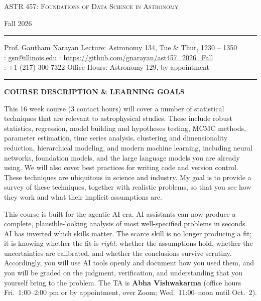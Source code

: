 

\vspace{-20em}
\centerline{\fontsize{22}{22}\selectfont\scshape  ASTR 457: Foundations of Data Science in Astronomy}
\vskip -2pt
\centerline{\headerfont Fall 2026}
\vskip -12pt
{\rule{\textwidth}{1pt}}

\vskip -10pt
Prof. Gautham Narayan                      \hfill Lecture: Astronomy 134, Tue \& Thur, 1230 -- 1350\\
\Letter: \href{mailto:gsn@illinois.edu}{gsn@illinois.edu} \hfill \Mundus: \url{https://github.com/gnarayan/ast457_2026_Fall}\\
\Telefon: +1 (217) 300-7322 \hfill Office Hours: Astronomy 129, by appointment \\
{\rule{\textwidth}{1pt}}
\vskip 7pt

{\large \bf \headerfont \color{RoyalBlue} COURSE DESCRIPTION \& LEARNING GOALS}

This 16 week course (3 contact hours) will cover a number of statistical
techniques that are relevant to astrophysical studies. These include robust
statistics, regression, model building and hypotheses testing, MCMC methods,
parameter estimation, time series analysis, clustering and dimensionality
reduction, hierarchical modeling, and modern machine learning, including
neural networks, foundation models, and the large language models you are
already using. We will also cover best practices for writing code and version
control. These techniques are ubiquitous in science and industry. My goal is to
provide a survey of these techniques, together with realistic problems, so that
you see how they work and what their implicit assumptions are.

This course is built for the agentic AI era. AI
assistants can now produce a complete, plausible-looking analysis of most
well-specified problems in seconds. AI has inverted which skills matter. The scarce skill is no longer
producing a fit; it is knowing whether the fit is \emph{right}: whether the
assumptions hold, whether the uncertainties are calibrated, and whether the
conclusions survive scrutiny. Accordingly, you will use AI tools openly and
document how you used them, and you will be graded on the judgment, verification,
and understanding that you yourself bring to the problem. The TA is
{\color{RoyalBlue} \textbf{Abha Vishwakarma}} (office hours Fri.\
1:00--2:00 pm or by appointment, over Zoom; Wed.\ 11:00--noon until Oct.~2).

